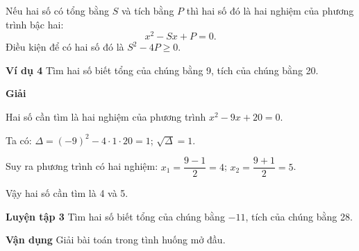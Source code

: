 \begin{lesson}
    \answerline
    \answerline

    \begin{keyconcept}
        Nếu hai số có tổng bằng $S$ và tích bằng $P$ thì hai số đó là hai nghiệm của phương trình bậc hai:
        \[
            x^2-Sx+P=0.
        \]
        Điều kiện để có hai số đó là $S^2-4P\ge0$.
    \end{keyconcept}

    \textbf{Ví dụ 4} Tìm hai số biết tổng của chúng bằng 9, tích của chúng bằng 20.

    \textbf{Giải}

    Hai số cần tìm là hai nghiệm của phương trình $x^2-9x+20=0$.

    Ta có: $\Delta=(-9)^2-4\cdot1\cdot20=1$; $\sqrt{\Delta}=1$.

    Suy ra phương trình có hai nghiệm: $x_1=\dfrac{9-1}{2}=4$; $x_2=\dfrac{9+1}{2}=5$.

    Vậy hai số cần tìm là 4 và 5.

    \textbf{Luyện tập 3} Tìm hai số biết tổng của chúng bằng $-11$, tích của chúng bằng 28.

    \answerline
    \answerline

    \textbf{Vận dụng} Giải bài toán trong tình huống mở đầu.

    \answerline
    \answerline
\end{lesson}

